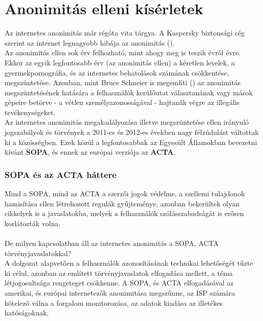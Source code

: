 \section{Anonimitás elleni kísérletek} %
\label{ssub:subsubsection_name}

Az internetes anonimitás már régóta vita tárgya. A Kaspersky biztonsági cég szerint az internet legnagyobb hibája az anonimitás (\cite{kaspersky}).\hfill\\

Az anonimitás ellen sok érv felhozható, mint ahogy meg is teszik évről évre. Ekkor az egyik legfontosabb érv (az anonimitás ellen) a kéretlen levelek, a gyermekpornográfia, és az internetes behatolások számának csökkentése, megszüntetése. Azonban, mint Bruce Schneier is megemlíti (\cite{schneier}) az anonimitás megszüntetésének hatására a felhasználók kerülőutat választanának vagy mások gépeire betörve - a vétlen személyazonosságával - hajtanák végre az illegális tevékenységeket.\hfill\\

Az internetes anonimitás megakadályozása illetve megszüntetése ellen irányuló jogszabályok és törvények a 2011-es és 2012-es években nagy félzúdulást váltottak ki a közösségben. Ezek közül a legfontosabbak az Egyesült Államokban bevezetni kívánt \textbf{SOPA}, és ennek az európai verziója az \textbf{ACTA}.

\subsubsection{SOPA és az ACTA háttere} %
\label{ssect:sopa_és_az_acta_háttere}
Mind a SOPA, mind az ACTA a szerzői jogok védelme, a szellemi tulajdonok hamisítása ellen létrehozott regulák gyűjteménye, azonban bekerültek olyan cikkelyek is a javaslatokba, melyek a felhasználók szólásszabadságát is erősen korlátozták volna.\hfill\\
\\
De milyen kapcsolatban áll az internetes anonimitás a SOPA, ACTA törvényjavaslatokkal?
\\
A dolgozat alapvetően a felhasználók azonosításának technikai lehetőségét tűzte ki célul, azonban az említett törvényjavaslatok elfogadása mellett, a téma létjogosultsága rengeteget csökkenne. A SOPA, és ACTA elfogadásával az amerikai, és európai internetezők anonimitása megszűnne, az ISP számára kötelező válna a forgalom monitorozása, az adatok kiadása az illetékes hatóságoknak. \cite{thn_sopa} 

